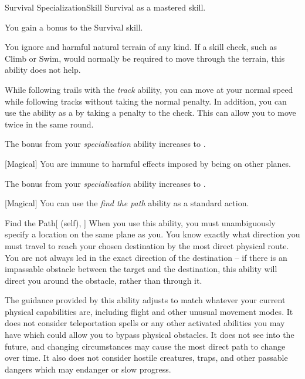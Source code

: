     \begin{feat}{Survival Specialization}{Skill}
        \featpre Survival as a mastered skill.

         You gain a  bonus to the Survival skill.

         You ignore  and harmful natural terrain of any kind.
        If a skill check, such as Climb or Swim, would normally be required to move through the terrain, this ability does not help.

        While following trails with the \textit{track} ability, you can move at your normal speed while following tracks without taking the normal  penalty.
        In addition, you can use the ability as a  by taking a  penalty to the check.
        This can allow you to move twice in the same round.

         The bonus from your \textit{specialization} ability increases to .

        [Magical] You are immune to harmful effects imposed by being on other planes.

         The bonus from your \textit{specialization} ability increases to .

        [Magical] You can use the \textit{find the path} ability as a standard action.
        \begin{attuneability}{Find the Path}[ (self), ]
            When you use this ability, you must unambiguously specify a location on the same plane as you.
            You know exactly what direction you must travel to reach your chosen destination by the most direct physical route.
            You are not always led in the exact direction of the destination -- if there is an impassable obstacle between the target and the destination, this ability will direct you around the obstacle, rather than through it.

            The guidance provided by this ability adjusts to match whatever your current physical capabilities are, including flight and other unusual movement modes.
            It does not consider teleportation spells or any other activated abilities you may have which could allow you to bypass physical obstacles.
            It does not see into the future, and changing circumstances may cause the most direct path to change over time.
            It also does not consider hostile creatures, traps, and other passable dangers which may endanger or slow progress.
        \end{attuneability}
    \end{feat}

